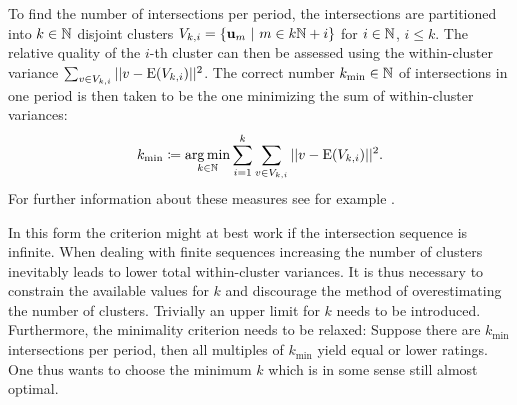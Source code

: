 To find the number of intersections per period, the intersections are partitioned into $k \in \mathbb{N}$ disjoint clusters $V_{k,i} = \{ \textbf{u}_m\ |\ m \in k\mathbb{N}+i \}$ for $i \in \mathbb{N}$, $i \le k$.
The relative quality of the $i$-th cluster can then be assessed using the within-cluster variance $\sum_{v \in V_{k,i} } ||v - \operatorname{E}(V_{k,i})||^2$.
The correct number $k_{\text{min}} \in \mathbb{N}$ of intersections in one period is then taken to be the one minimizing the sum of within-cluster variances:
\[
	k_\text{min} \coloneqq \operatorname*{arg\,min}_{k \in \mathbb{N}} \sum_{i = 1}^k \sum_{v \in V_{k,i} } ||v - \operatorname{E}(V_{k,i})||^2 \text.
\]
For further information about these measures see for example \cite{halkidi2001clustering}. %

In this form the criterion might at best work if the intersection sequence is infinite.
When dealing with finite sequences increasing the number of clusters inevitably leads to lower total within-cluster variances.
It is thus necessary to constrain the available values for $k$ and discourage the method of overestimating the number of clusters.
Trivially an upper limit for $k$ needs to be introduced.
Furthermore, the minimality criterion needs to be relaxed: Suppose there are $k_\text{min}$ intersections per period, then all multiples of $k_\text{min}$ yield equal or lower ratings.
One thus wants to choose the minimum $k$ which is in some sense still almost optimal.
